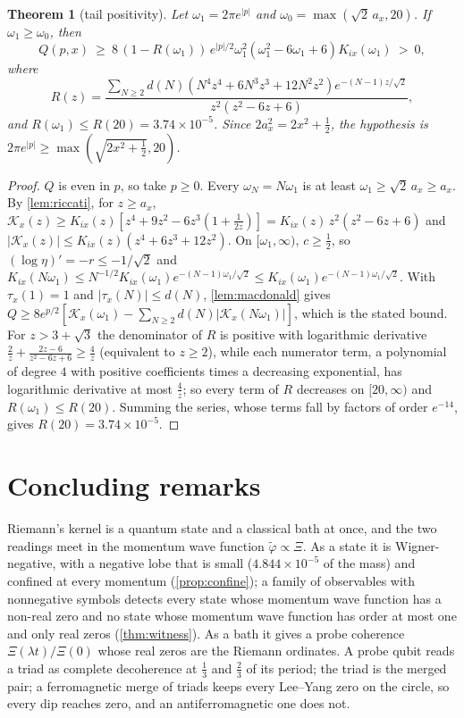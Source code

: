 \documentclass[11pt]{article}
\newtheorem{theorem}{Theorem}[section]
\theoremstyle{definition}\newtheorem{definition}[theorem]{Definition}
\theoremstyle{remark}\newtheorem{remark}[theorem]{Remark}
\begin{document}
\begin{theorem}[tail positivity]\label{thm:tail}
Let $\omega_1=2\pi e^{|p|}$ and $\omega_0=\max(\sqrt2\,a_x,20)$. If $\omega_1\ge \omega_0$, then
\[
Q(p,x)\ \ge\ 8\,(1-R(\omega_1))\,e^{|p|/2}\omega_1^2(\omega_1^2-6\omega_1+6)K_{ix}(\omega_1)\ >\ 0,
\]
where
\[
R(z)=\frac{\sum_{N\ge2}d(N)(N^4z^4+6N^3z^3+12N^2z^2)e^{-(N-1)z/\sqrt2}}{z^2(z^2-6z+6)},
\]
and $R(\omega_1)\le R(20)=3.74\times10^{-5}$. Since $2a_x^2=2x^2+\frac12$, the hypothesis is $2\pi e^{|p|}\ge\max(\sqrt{2x^2+\frac12},20)$.
\end{theorem}
\begin{proof}
$Q$ is even in $p$, so take $p\ge0$. Every $\omega_N=N\omega_1$ is at least $\omega_1\ge\sqrt2\,a_x\ge a_x$. By \cref{lem:riccati}, for $z\ge a_x$, $\mathcal K_x(z)\ge K_{ix}(z)[z^4+9z^2-6z^3(1+\frac1{2z})]=K_{ix}(z)\,z^2(z^2-6z+6)$ and $|\mathcal K_x(z)|\le K_{ix}(z)(z^4+6z^3+12z^2)$. On $[\omega_1,\infty)$, $c\ge\frac12$, so $(\log\eta)'=-r\le-1/\sqrt2$ and $K_{ix}(N\omega_1)\le N^{-1/2}K_{ix}(\omega_1)e^{-(N-1)\omega_1/\sqrt2}\le K_{ix}(\omega_1)e^{-(N-1)\omega_1/\sqrt2}$. With $\tau_x(1)=1$ and $|\tau_x(N)|\le d(N)$, \cref{lem:macdonald} gives $Q\ge8e^{p/2}[\mathcal K_x(\omega_1)-\sum_{N\ge2}d(N)|\mathcal K_x(N\omega_1)|]$, which is the stated bound. For $z>3+\sqrt3$ the denominator of $R$ is positive with logarithmic derivative $\frac2z+\frac{2z-6}{z^2-6z+6}\ge\frac4z$ (equivalent to $z\ge2$), while each numerator term, a polynomial of degree $4$ with positive coefficients times a decreasing exponential, has logarithmic derivative at most $\frac4z$; so every term of $R$ decreases on $[20,\infty)$ and $R(\omega_1)\le R(20)$. Summing the series, whose terms fall by factors of order $e^{-14}$, gives $R(20)=3.74\times10^{-5}$.
\end{proof}

\section{Concluding remarks}\label{sec:concl}
Riemann's kernel is a quantum state and a classical bath at once, and the two readings meet in the momentum wave function $\tilde\varphi\propto\Xi$. As a state it is Wigner-negative, with a negative lobe that is small ($4.844\times10^{-5}$ of the mass) and confined at every momentum (\cref{prop:confine}); a family of observables with nonnegative symbols detects every state whose momentum wave function has a non-real zero and no state whose momentum wave function has order at most one and only real zeros (\cref{thm:witness}). As a bath it gives a probe coherence $\Xi(\lambda t)/\Xi(0)$ whose real zeros are the Riemann ordinates. A probe qubit reads a triad as complete decoherence at $\frac13$ and $\frac23$ of its period; the triad is the merged pair; a ferromagnetic merge of triads keeps every Lee--Yang zero on the circle, so every dip reaches zero, and an antiferromagnetic one does not.
\end{document}
